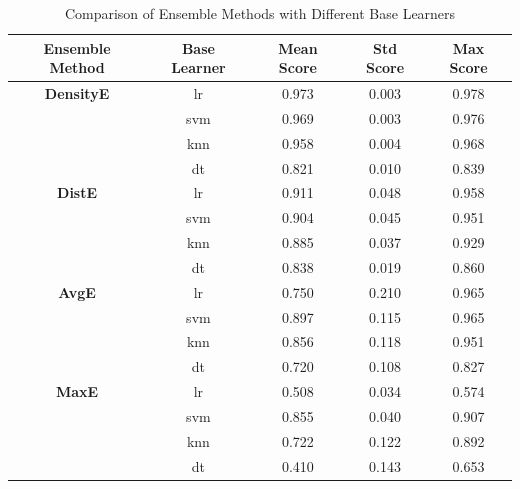 \documentclass[lettersize,journal]{IEEEtran}
\begin{document}
	\begin{table}[H]
		
	    \begin{center}
			
			\caption{Comparison of Ensemble Methods with Different Base Learners}
			
			\label{tab:ensemble_comparison}
			
			\begin{tabular}{|c|c|c|c|c|}
				
				\hline 
				
				\textbf{Ensemble Method} & \textbf{Base Learner} & \textbf{Mean Score} & \textbf{Std Score} & \textbf{Max Score} \\
				
				\hline
				
				\textbf{DensityE} & lr & 0.973 & 0.003 & 0.978 \\
				
				& svm & 0.969 & 0.003 & 0.976 \\
				
				& knn & 0.958 & 0.004 & 0.968 \\
				
				& dt & 0.821 & 0.010 & 0.839 \\
				
				\hline 
				
				\textbf{DistE} & lr & 0.911 & 0.048 & 0.958 \\
				
				& svm & 0.904 & 0.045 & 0.951 \\
				
				& knn & 0.885 & 0.037 & 0.929 \\
				
				& dt & 0.838 & 0.019 & 0.860 \\
				
				\hline 
				
				\textbf{AvgE} & lr & 0.750 & 0.210 & 0.965 \\
				
				& svm & 0.897 & 0.115 & 0.965 \\
				
				& knn & 0.856 & 0.118 & 0.951 \\
				
				& dt & 0.720 & 0.108 & 0.827 \\
				
				\hline 
				
				\textbf{MaxE} & lr & 0.508 & 0.034 & 0.574 \\
				
				& svm & 0.855 & 0.040 & 0.907 \\
				
				& knn & 0.722 & 0.122 & 0.892 \\
				
				& dt & 0.410 & 0.143 & 0.653 \\
				
				\hline
				
			\end{tabular}
			
		\end{center}
		
	\end{table}
	
\end{document}
